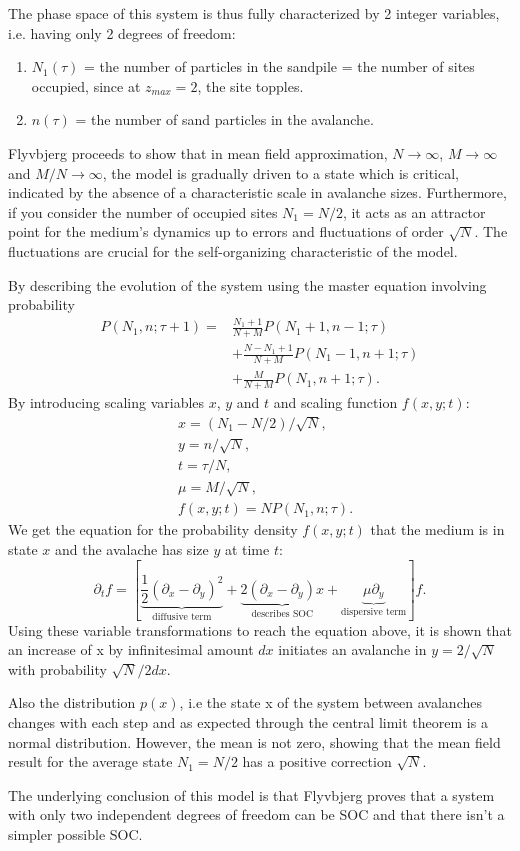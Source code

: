 The phase space of this system is thus fully characterized by 2 integer variables, i.e. having only 2 degrees of freedom:
\begin{enumerate}
	\item $N_1(\tau)$ = the number of particles in the sandpile = the number of sites occupied, since at $z_{max}=2$, the site topples.
	\item $n(\tau)$ = the number of sand particles in the avalanche.
\end{enumerate}\par 
Flyvbjerg proceeds to show that in mean field approximation, $N \to \infty$, $M \to \infty$ and $M/N \to \infty$, the model is gradually driven to a state which is critical, indicated by the absence of a characteristic scale in avalanche sizes. Furthermore, if you consider the number of occupied sites $N_1 = N/2$, it acts as an attractor point for the medium's dynamics up to errors and fluctuations of order $\sqrt{N}$. The fluctuations are crucial for the self-organizing characteristic of the model.\par 
By describing the evolution of the system using the master equation involving probability
\begin{equation}
\begin{split}
P(N_1,n;\tau+1) =& \frac{N_1+1}{N+M}P(N_1+1,n-1;\tau) \\
&+ \frac{N-N_1+1}{N+M}P(N_1-1,n+1;\tau)\\
&+ \frac{M}{N+M}P(N_1,n+1;\tau).
\end{split}
\end{equation}
By introducing scaling variables $x$, $y$ and $t$ and scaling function $f(x,y;t)$:
\begin{align}
&x = (N_1-N/2)/\sqrt{N},\\
&y = n/\sqrt{N},\\
&t = \tau/N,\\
&\mu = M/ \sqrt{N},\\
&f(x,y;t) = NP(N_1,n;\tau).
\end{align}
We get the equation for the probability density $f(x,y;t)$ that the medium is in state $x$ and the avalache has size $y$ at time $t$:
\begin{equation}
\partial_t f = [\underbrace{\frac{1}{2}(\partial_x - \partial_y)^2}_\text{diffusive term} + \underbrace{2(\partial_x - \partial_y)x}_\text{describes SOC} + \underbrace{\mu \partial_y}_\text{dispersive term}]f.
\end{equation}
Using these variable transformations to reach the equation above, it is shown that an increase of x by infinitesimal amount $dx$ initiates an avalanche in $y = 2/\sqrt{N}$ with probability $\sqrt{N}/2dx$. \par 
Also the distribution $p(x)$, i.e the state x of the system between avalanches changes with each step and as expected through the central limit theorem is a normal distribution. However, the mean is not zero, showing that the mean field result for the average state $N_1 = N/2$ has a positive correction $\sqrt{N}$. \par
The underlying conclusion of this model is that Flyvbjerg proves that a system with only two independent degrees of freedom can be SOC and that there isn't a simpler possible SOC.


